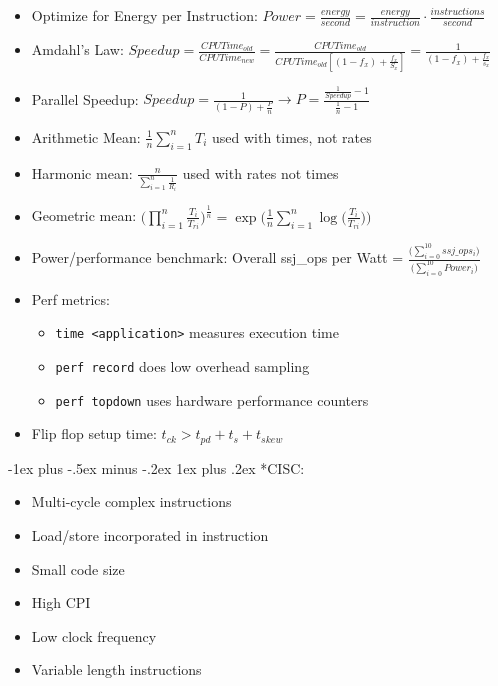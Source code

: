 \documentclass[landscape,10pt]{article}
\makeatletter
\renewcommand{\subsubsection}{\@startsection{subsubsection}{3}{0mm}%
            {-1ex plus -.5ex minus -.2ex}%
            {1ex plus .2ex}%
            {\normalfont\small\bfseries}}
\makeatother
\begin{document}
\begin{multicols}{2}
\begin{itemize}
    \item[] Optimize for Energy per Instruction: \(Power = \frac{energy}{second} = \frac{energy}{instruction} \cdot \frac{instructions}{second}\)
    \item[] Amdahl's Law: \(Speedup = \frac{CPUTime_{old}}{CPUTime_{new}} = \frac{CPUTime_{old}}{CPUTime_{old} [(1 - f_x) + \tfrac{f_x}{S_x}]} = \frac{1}{(1 - f_x) + \tfrac{f_x}{s_x}}\)
    \item[] Parallel Speedup: \(Speedup = \frac{1}{(1 - P) + \tfrac{P}{n}} \rightarrow P = \frac{\frac{1}{Speedup} - 1}{\tfrac{1}{n} - 1}\)
    \item[] Arithmetic Mean: \(\frac{1}{n} \sum \limits_{i=1}^{n}T_i\) used with times, not rates
    \item[] Harmonic mean: \(\frac{n}{\sum \limits_{i=1}^{n}\frac{1}{R_i}}\) used with rates not times
    \item[] Geometric mean: \(\Bigg ( \prod \limits_{i=1}^{n} \frac{T_i}{T_{ri}} \Bigg)^{\tfrac{1}{n}} = \exp\Bigg(\frac{1}{n}\sum \limits_{i=1}^{n}\log\Big(\frac{T_i}{T_{ri}}\Big) \Bigg)\)
    \item[] Power/performance benchmark: Overall ssj\_ops per Watt = \(\frac{\Big(\sum \limits_{i=0}^{10}ssj\_ops_i\Big)}{\Big(\sum\limits_{i=0}^{10}Power_i\Big)}\)
    \item[] Perf metrics: 
    \begin{itemize}
        \item[] \texttt{time <application>} measures execution time
        \item[] \texttt{perf record} does low overhead sampling
        \item[] \texttt{perf topdown} uses hardware performance counters
    \end{itemize}
    \item[] Flip flop setup time: \(t_{ck} > t_{pd} + t_s + t_{skew}\)
\end{itemize}

\subsubsection*{CISC:}
\begin{itemize}
    \item[] Multi-cycle complex instructions
    \item[] Load/store incorporated in instruction
    \item[] Small code size
    \item[] High CPI
    \item[] Low clock frequency
    \item[] Variable length instructions
\end{itemize}

\end{multicols}
\end{document}
